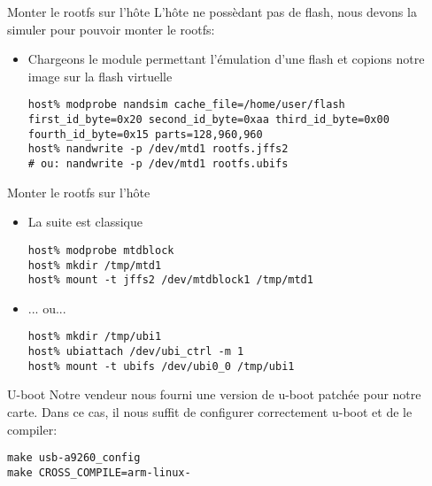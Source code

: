 \begin{frame}[fragile=singleslide]{Monter le rootfs sur l'hôte}
  L'hôte  ne possèdant  pas  de  flash, nous  devons  la simuler  pour
  pouvoir monter le rootfs:
  \begin{itemize}
  \item  Chargeons le  module  permettant l'émulation  d'une flash  et
    copions notre image sur la flash virtuelle
    \begin{lstlisting}
host% modprobe nandsim cache_file=/home/user/flash first_id_byte=0x20 second_id_byte=0xaa third_id_byte=0x00 fourth_id_byte=0x15 parts=128,960,960
host% nandwrite -p /dev/mtd1 rootfs.jffs2
# ou: nandwrite -p /dev/mtd1 rootfs.ubifs
     \end{lstlisting}
  \end{itemize}
\end{frame}

\begin{frame}[fragile=singleslide]{Monter le rootfs sur l'hôte}
  \begin{itemize}
\item La suite est classique
    \begin{lstlisting}
host% modprobe mtdblock
host% mkdir /tmp/mtd1
host% mount -t jffs2 /dev/mtdblock1 /tmp/mtd1
     \end{lstlisting}
     \item ... ou...
    \begin{lstlisting}
host% mkdir /tmp/ubi1
host% ubiattach /dev/ubi_ctrl -m 1
host% mount -t ubifs /dev/ubi0_0 /tmp/ubi1
     \end{lstlisting}
  \end{itemize}
\end{frame}



\begin{frame}[fragile=singleslide]{U-boot}
  Notre vendeur nous  fourni une version de u-boot  patchée pour notre
  carte. Dans ce cas, il nous suffit de configurer correctement u-boot
  et de le compiler:
  \begin{lstlisting}
make usb-a9260_config
make CROSS_COMPILE=arm-linux-
  \end{lstlisting}
\end{frame}

